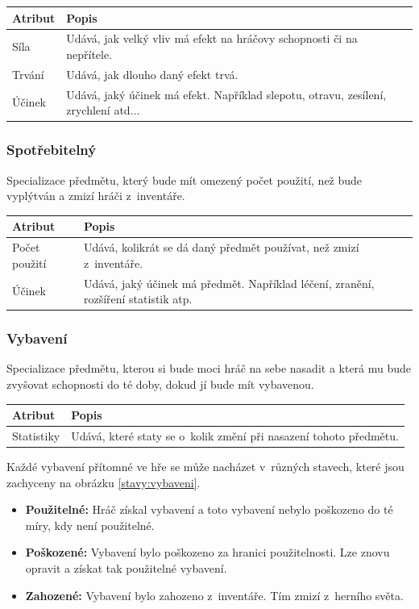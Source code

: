 \documentclass[12pt,a4paper]{article}
\begin{document}
\noindent
\begin{tabularx}{\textwidth}{|l|>{\raggedright}X|}
\hline
\cellcolor{black!80}\textcolor{gray!25}{\textbf{Atribut}} & \cellcolor{black!80}\textcolor{gray!20}{\textbf{Popis}}\tabularnewline \hline
 Síla & Udává, jak velký vliv má efekt na hráčovy schopnosti či na
  nepřítele. \tabularnewline
\hline
 Trvání & Udává, jak dlouho daný efekt trvá. \tabularnewline
\hline
 Účinek & Udává, jaký účinek má efekt. Například slepotu, otravu, zesílení,
             zrychlení atd$\ldots$
\tabularnewline\hline
\end{tabularx}

\subsubsection{Spotřebitelný}
Specializace předmětu, který bude mít omezený počet použití, než bude vyplýtván
a zmizí hráči z~inventáře.

\noindent
\begin{tabularx}{\textwidth}{|l|>{\raggedright}X|}
\hline
\cellcolor{black!80}\textcolor{gray!25}{\textbf{Atribut}} & \cellcolor{black!80}\textcolor{gray!20}{\textbf{Popis}}\tabularnewline \hline
 Počet použití & Udává, kolikrát se dá daný předmět používat, než zmizí
                   z~inventáře.\tabularnewline
\hline
 Účinek & Udává, jaký účinek má předmět. Například léčení, zranění,
             rozšíření statistik atp.
\tabularnewline\hline
\end{tabularx}

\subsubsection{Vybavení}
Specializace předmětu, kterou si bude moci hráč na sebe nasadit a která mu bude
zvyšovat schopnosti do té doby, dokud jí bude mít vybavenou.

\noindent
\begin{tabularx}{\textwidth}{|l|>{\raggedright}X|}
\hline
\cellcolor{black!80}\textcolor{gray!25}{\textbf{Atribut}} & \cellcolor{black!80}\textcolor{gray!20}{\textbf{Popis}}\tabularnewline \hline
 Statistiky & Udává, které staty se o~kolik změní při nasazení tohoto
  předmětu.
\tabularnewline\hline
\end{tabularx}

Každé vybavení přítomné ve hře se může nacházet v~různých stavech, které jsou
zachyceny na obrázku \ref{stavy:vybaveni}.

\begin {itemize}
\item{\textbf{Použitelné:} Hráč získal vybavení a toto vybavení nebylo poškozeno
  do té míry, kdy není použitelné.}
\item{\textbf{Poškozené:} Vybavení bylo poškozeno za hranici použitelnosti. Lze
  znovu opravit a získat tak použitelné vybavení.}
\item{\textbf{Zahozené:} Vybavení bylo zahozeno z~inventáře. Tím zmizí z~herního
  světa.}
\end {itemize}
\end{document}
